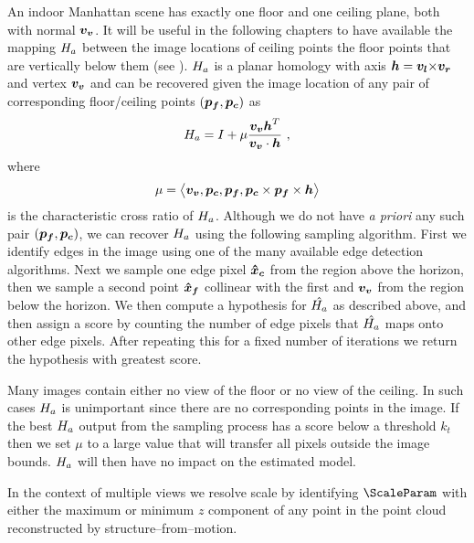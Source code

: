 An indoor Manhattan scene has exactly one floor and one ceiling plane,
both with normal $\vvpt$. It will be useful in the following chapters
to have available the mapping $\Hcf$ between the image locations of
ceiling points the floor points that are vertically below them (see
). $\Hcf$ is a planar homology with axis
$\horizon=\lvpt\cross\rvpt$ and vertex $\vvpt$ \cite{Criminisi01} and
can be recovered given the image location of any pair of corresponding
floor/ceiling points $(\FloorPt,\CeilPt)$ as
\begin{equation}
  \Hcf = I + \mu\frac{\vvpt\horizon^T}{\vvpt \cdot \horizon} ~,
\end{equation}
where
\begin{equation}
  \mu = \bigl\langle\vvpt,\CeilPt,\FloorPt,
  \CeilPt\times\FloorPt\times\horizon\bigr\rangle
\end{equation}
is the characteristic cross ratio of $\Hcf$. Although we do not have
\textit{a priori} any such pair $(\FloorPt,\CeilPt)$, we can recover
$\Hcf$ using the following sampling algorithm. First we identify edges
in the image using one of the many available edge detection
algorithms. Next we sample one edge pixel $\vect{\hat{x}_c}$ from the
region above the horizon, then we sample a second point
$\vect{\hat{x}_f}$ collinear with the first and $\vvpt$ from the
region below the horizon. We then compute a hypothesis for $\Hcfhat$
as described above, and then assign a score by counting the number of
edge pixels that $\Hcfhat$ maps onto other edge pixels. After
repeating this for a fixed number of iterations we return the
hypothesis with greatest score.

Many images contain either no view of the floor or no view of the
ceiling. In such cases $\Hcf$ is unimportant since there are no
corresponding points in the image. If the best $\Hcf$ output from the
sampling process has a score below a threshold $k_t$ then we set $\mu$
to a large value that will transfer all pixels outside the image
bounds. $\Hcf$ will then have no impact on the estimated model.

In the context of multiple views we resolve scale by identifying
$\ScaleParam$ with either the maximum or minimum $z$ component of any
point in the point cloud reconstructed by structure--from--motion.

